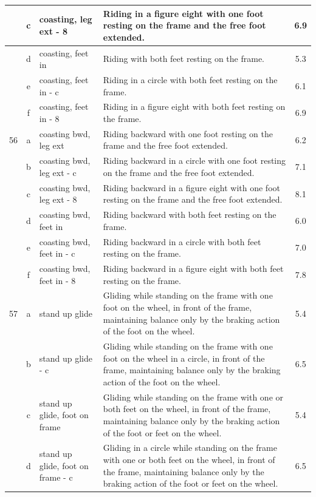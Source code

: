 \begin{longtable}{|r|c|p{4cm}|p{8cm}|c|}
\hline
  & c & coasting, leg ext - 8 & Riding in a figure eight with one foot resting on the frame and the free foot extended. & 6.9 \\ 
\hline
  & d & coasting, feet in & Riding with both feet resting on the frame. & 5.3 \\ 
\hline
  & e & coasting, feet in - c & Riding in a circle with both feet resting on the frame. & 6.1 \\ 
\hline
  & f & coasting, feet in - 8 & Riding in a figure eight with both feet resting on the frame. & 6.9 \\ 
\hline
56  & a & coasting bwd, leg ext & Riding backward with one foot resting on the frame and the free foot extended.  & 6.2 \\ 
\hline
  & b & coasting bwd, leg ext - c & Riding backward in a circle with one foot resting on the frame and the free foot extended.  & 7.1 \\ 
\hline
  & c & coasting bwd, leg ext - 8 & Riding backward in a figure eight with one foot resting on the frame and the free foot extended.  & 8.1 \\ 
\hline
  & d & coasting bwd, feet in & Riding backward with both feet resting on the frame.  & 6.0 \\ 
\hline
  & e & coasting bwd, feet in - c & Riding backward in a circle with both feet resting on the frame.  & 7.0 \\ 
\hline
  & f & coasting bwd, feet in - 8 & Riding backward in a figure eight with both feet resting on the frame.  & 7.8 \\ 
\hline
57  & a & stand up glide  & Gliding while standing on the frame with one foot on the wheel, in front of the frame, maintaining balance only by the braking action of the foot on the wheel. & 5.4 \\ 
\hline
  & b & stand up glide - c  & Gliding while standing on the frame with one foot on the wheel in a circle, in front of the frame, maintaining balance only by the braking action of the foot on the wheel. & 6.5 \\ 
\hline
  & c & stand up glide, foot on frame & Gliding while standing on the frame with one or both feet on the wheel, in front of the frame, maintaining balance only by the braking action of the foot or feet on the wheel. & 5.4 \\ 
\hline
  & d & stand up glide, foot on frame - c & Gliding in a circle while standing on the frame with one or both feet on the wheel, in front of the frame, maintaining balance only by the braking action of the foot or feet on the wheel. & 6.5 \\ 

\end{longtable}
